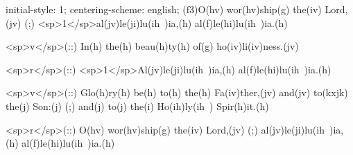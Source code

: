 initial-style: 1;
centering-scheme: english;
(f3)O(hv) wor(hv)ship(g) the(iv) Lord,(jv) (;) <sp>1</sp>al(jv)le(ji)lu(ih~)ia,(h) al(f)le(hi)lu(ih~)ia.(h)

<sp>v</sp>(::) In(h) the(h) beau(h)ty(h) of(g) ho(iv)li(iv)ness.(jv)

<sp>r</sp>(::) <sp>1</sp>Al(jv)le(ji)lu(ih~)ia,(h) al(f)le(hi)lu(ih~)ia.(h)

<sp>v</sp>(::) Glo(h)ry(h) be(h) to(h) the(h) Fa(iv)ther,(jv) and(jv) to(kxjk) the(j) Son:(j) (;) and(j) to(j) the(i) Ho(ih)ly(ih~) Spir(h)it.(h)

<sp>r</sp>(::) O(hv) wor(hv)ship(g) the(iv) Lord,(jv) (;) al(jv)le(ji)lu(ih~)ia,(h) al(f)le(hi)lu(ih~)ia.(h)